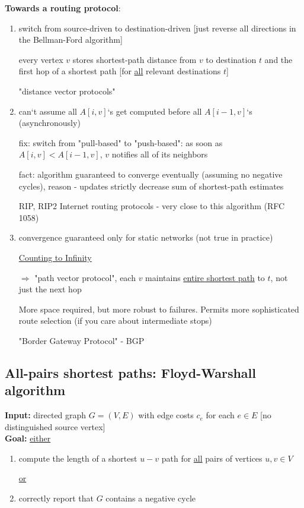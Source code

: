 \documentclass[a4paper,12pt]{article}
\theoremstyle{plain}
\theoremstyle{definition}
\theoremstyle{remark}
\begin{document}
\textbf{Towards a routing protocol}:
\begin{enumerate}
	\item switch from source-driven to destination-driven [just reverse all directions in the Bellman-Ford algorithm]

	every vertex $v$ stores shortest-path distance from $v$ to destination $t$ and the first hop of a shortest path [for \underline{all} relevant destinations $t$]

	"distance vector protocols"
	\item can`t assume all $A[i, v]$`s get computed before all $A[i-1, v]$`s (asynchronously)

	fix: switch from "pull-based" to "push-based": as soon as $A[i, v] < A[i-1, v]$, $v$ notifies all of its neighbors

	fact: algorithm guaranteed to converge eventually (assuming no negative cycles), reason - updates strictly decrease sum of shortest-path estimates

	RIP, RIP2 Internet routing protocols - very close to this algorithm (RFC 1058)
	\item convergence guaranteed only for static networks (not true in practice)

	\underline{Counting to Infinity}

	$\Rightarrow$ "path vector protocol", each $v$ maintains \underline{entire shortest path} to $t$, not just the next hop

	More space required, but more robust to failures. Permits more sophisticated route selection (if you care about intermediate stops)

	"Border Gateway Protocol" - BGP
\end{enumerate}



\subsection{All-pairs shortest paths: Floyd-Warshall algorithm}
\textbf{Input:} directed graph $G = (V, E)$ with edge costs $c_e$ for each $e \in E$ [no distinguished source vertex]
\\

\textbf{Goal:} \underline{either}
\begin{enumerate}
	\item compute the length of a shortest $u-v$ path for \underline{all} pairs of vertices $u, v \in V$

	\underline{or}

	\item correctly report that $G$ contains a negative cycle
\end{enumerate}
\end{document}
